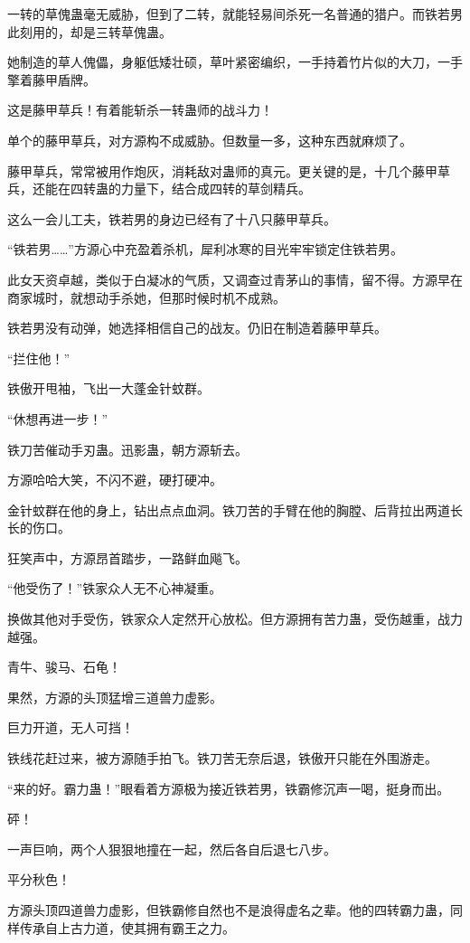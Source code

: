 \begin{this_body}
一转的草傀蛊毫无威胁，但到了二转，就能轻易间杀死一名普通的猎户。而铁若男此刻用的，却是三转草傀蛊。

她制造的草人傀儡，身躯低矮壮硕，草叶紧密编织，一手持着竹片似的大刀，一手擎着藤甲盾牌。

这是藤甲草兵！有着能斩杀一转蛊师的战斗力！

单个的藤甲草兵，对方源构不成威胁。但数量一多，这种东西就麻烦了。

藤甲草兵，常常被用作炮灰，消耗敌对蛊师的真元。更关键的是，十几个藤甲草兵，还能在四转蛊的力量下，结合成四转的草剑精兵。

这么一会儿工夫，铁若男的身边已经有了十八只藤甲草兵。

“铁若男……”方源心中充盈着杀机，犀利冰寒的目光牢牢锁定住铁若男。

此女天资卓越，类似于白凝冰的气质，又调查过青茅山的事情，留不得。方源早在商家城时，就想动手杀她，但那时候时机不成熟。

铁若男没有动弹，她选择相信自己的战友。仍旧在制造着藤甲草兵。

“拦住他！”

铁傲开甩袖，飞出一大蓬金针蚊群。

“休想再进一步！”

铁刀苦催动手刃蛊。迅影蛊，朝方源斩去。

方源哈哈大笑，不闪不避，硬打硬冲。

金针蚊群在他的身上，钻出点点血洞。铁刀苦的手臂在他的胸膛、后背拉出两道长长的伤口。

狂笑声中，方源昂首踏步，一路鲜血飚飞。

“他受伤了！”铁家众人无不心神凝重。

换做其他对手受伤，铁家众人定然开心放松。但方源拥有苦力蛊，受伤越重，战力越强。

青牛、骏马、石龟！

果然，方源的头顶猛增三道兽力虚影。

巨力开道，无人可挡！

铁线花赶过来，被方源随手拍飞。铁刀苦无奈后退，铁傲开只能在外围游走。

“来的好。霸力蛊！”眼看着方源极为接近铁若男，铁霸修沉声一喝，挺身而出。

砰！

一声巨响，两个人狠狠地撞在一起，然后各自后退七八步。

平分秋色！

方源头顶四道兽力虚影，但铁霸修自然也不是浪得虚名之辈。他的四转霸力蛊，同样传承自上古力道，使其拥有霸王之力。


\end{this_body}
